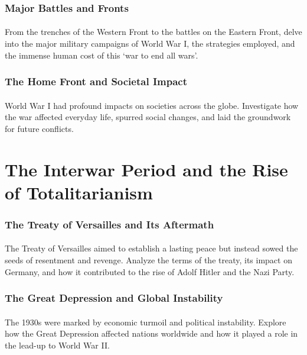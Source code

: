 \documentclass[a4paper,12pt]{book}
\begin{document}
\subsubsection*{Major Battles and Fronts}
\paragraph{}
From the trenches of the Western Front to the battles on the Eastern Front, delve into the major military campaigns of World War I, the strategies employed, and the immense human cost of this ‘war to end all wars’.

\subsubsection*{The Home Front and Societal Impact}
\paragraph{}
World War I had profound impacts on societies across the globe. Investigate how the war affected everyday life, spurred social changes, and laid the groundwork for future conflicts.

\section*{The Interwar Period and the Rise of Totalitarianism}
\paragraph{}
\subsubsection*{The Treaty of Versailles and Its Aftermath}
\paragraph{}
The Treaty of Versailles aimed to establish a lasting peace but instead sowed the seeds of resentment and revenge. Analyze the terms of the treaty, its impact on Germany, and how it contributed to the rise of Adolf Hitler and the Nazi Party.

\subsubsection*{The Great Depression and Global Instability}
\paragraph{}
The 1930s were marked by economic turmoil and political instability. Explore how the Great Depression affected nations worldwide and how it played a role in the lead-up to World War II.
\end{document}
